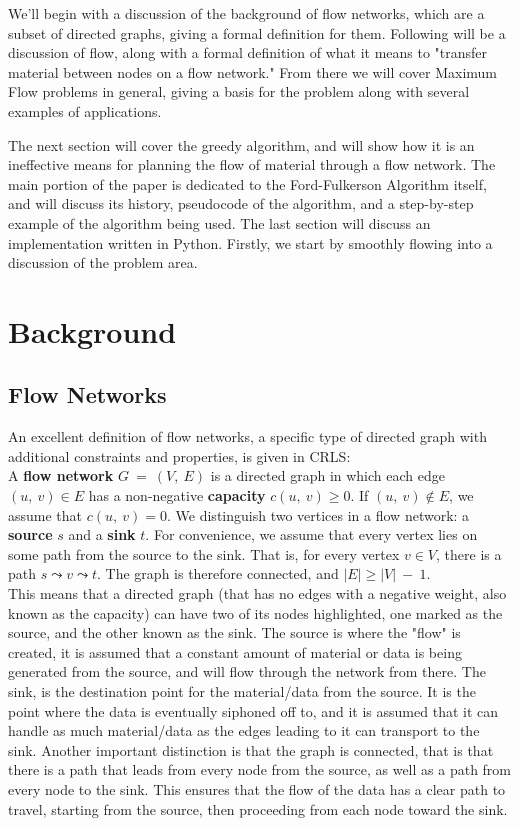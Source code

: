 \documentclass[conference]{IEEEtran}
\begin{document}
We'll begin with a discussion of the background of flow networks, which are a subset of directed graphs, giving a formal definition for them. Following will be a discussion of flow, along with a formal definition of what it means to "transfer material between nodes on a flow network." From there we will cover Maximum Flow problems in general, giving a basis for the problem along with several examples of applications. 

The next section will cover the greedy algorithm, and will show how it is an ineffective means for planning the flow of material through a flow network. The main portion of the paper is dedicated to the Ford-Fulkerson Algorithm itself, and will discuss its history, pseudocode of the algorithm, and a step-by-step example of the algorithm being used. The last section will discuss an implementation written in Python. Firstly, we start by smoothly flowing into a discussion of the problem area.

\section{Background}
\subsection{Flow Networks}
An excellent definition of flow networks, a specific type of directed graph with additional constraints and properties, is given in CRLS:\\

A \textbf{flow network} $G\ =\ (V,\ E)$ is a directed graph in which each edge $(u,\ v) \in E$ has a non-negative \textbf{capacity} $c(u,\ v) \geq 0$. If $(u,\ v) \notin E$, we assume that $c(u,\ v) = 0$. We distinguish two vertices in a flow network: a \textbf{source} $s$ and a \textbf{sink} $t$. For convenience, we assume that every vertex lies on some path from the source to the sink. That is, for every vertex $v \in V$, there is a path $s \leadsto v \leadsto t$. The graph is therefore connected, and $|E| \geq |V|\ -\ 1$.\cite{CLRS:2001}\\

This means that a directed graph (that has no edges with a negative weight, also known as the capacity) can have two of its nodes highlighted, one marked as the source, and the other known as the sink. The source is where the "flow" is created, it is assumed that a constant amount of material or data is being generated from the source, and will flow through the network from there. The sink, is the destination point for the material/data from the source. It is the point where the data is eventually siphoned off to, and it is assumed that it can handle as much material/data as the edges leading to it can transport to the sink. Another important distinction is that the graph is connected, that is that there is a path that leads from every node from the source, as well as a path from every node to the sink. This ensures that the flow of the data has a clear path to travel, starting from the source, then proceeding from each node toward the sink.
\end{document}
